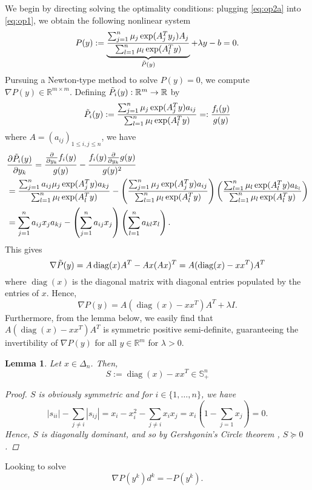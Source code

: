 \documentclass[10pt,a4paper]{article}
\numberwithin{equation}{section}
\newtheorem{lemma}[theorem]{Lemma}
\theoremstyle{definition}
\def\rr{{\mathbb R}}
\DeclareMathOperator{\diag}{diag}
\begin{document}
We begin by directing solving the optimality conditions: plugging \eqref{eq:op2a} into \eqref{eq:op1}, we obtain the following nonlinear system
\[
P(y) := \underbrace{\frac{\sum_{j=1}^n \mu_j  \exp(A_j^T y_j) A_j}{\sum_{l=1}^n \mu_l  \exp(A_l^T y)}}_{\Tilde{P}(y)} + \lambda y - b = 0.
\]
Pursuing a Newton-type method to solve $P(y) = 0$, we compute $\nabla P(y) \in \rr^{m \times m}$. Defining $\Tilde{P}_i(y): \rr^m \to \rr$ by
\[
\Tilde{P}_i(y) := \frac{\sum_{j=1}^n \mu_j  \exp(A_j^T y) a_{ij}}{\sum_{l=1}^n \mu_l  \exp(A_l^T y)} =: \frac{f_i(y)}{g(y)}
\]
where $A = (a_{ij})_{1 \leq i, j \leq n}$, we have
\begin{align*}
    &\frac{\partial \Tilde{P}_i(y)}{\partial y_k}  = \frac{ \frac{\partial}{\partial y_k} f_i(y)}{g(y)} - \frac{f_i(y) \frac{\partial}{\partial y_k} g(y)}{g(y)^2} \\
    &= \frac{\sum_{j=1}^n a_{ij} \mu_j \exp(A_j^Ty) a_{kj}}{\sum_{l=1}^n \mu_l  \exp(A_l^T y)} - \left(\frac{\sum_{j=1}^n \mu_j  \exp(A_j^T y) a_{ij}}{\sum_{l=1}^n \mu_l  \exp(A_l^T y)}\right)\left(\frac{\sum_{l=1}^n \mu_l  \exp(A_l^T y) a_{k_l}}{\sum_{l=1}^n \mu_l  \exp(A_l^T y)} \right) \\
    &= \sum_{j=1}^n a_{ij} x_j a_{kj} - \left(\sum_{j=1}^n a_{ij} x_j \right) \left( \sum_{l=1}^n a_{kl}  x_l \right).
\end{align*}
This gives 
\[
\nabla \Tilde{P}(y) = A \diag(x) A^T - Ax(Ax)^T = A(\diag(x) - xx^T)A^T
\]
where $\diag(x)$ is the diagonal matrix with diagonal entries populated by the entries of $x$. Hence,
\[
\nabla P(y) = A(\diag(x) - xx^T)A^T + \lambda I.
\]
Furthermore, from the lemma below, we easily find that $A(\diag(x) - xx^T)A^T$ is symmetric positive semi-definite, guaranteeing the invertibility of  $\nabla P(y)$ for all $y \in \rr^m$ for $\lambda > 0$.



\begin{lemma}
    Let $x \in \Delta_n$. Then,
\[
    S := \diag(x)
 - x x^T \in \mathbb{S}_+^n
 \]
 \begin{proof}
     $S$ is obviously symmetric and for $i \in \{1, \dots, n\}$, we have
     \[
         |s_{ii}| - \sum_{j \neq i} |s_{ij}| = x_i - x_i^2 - \sum_{j \neq i} x_i x_j = x_i (1 - \sum_{j=1} x_j) = 0.
     \]
     Hence, $S$ is diagonally dominant, and so by Gershgonin's Circle theorem \cite[\S{6}]{Horn_Johnson_2012}, $S \succeq 0$.
 \end{proof}
\end{lemma}

Looking to solve \begin{equation}\label{eq:Newton_P}
\nabla P(y^k)d^k = - P(y^k).
\end{equation}
\end{document}
